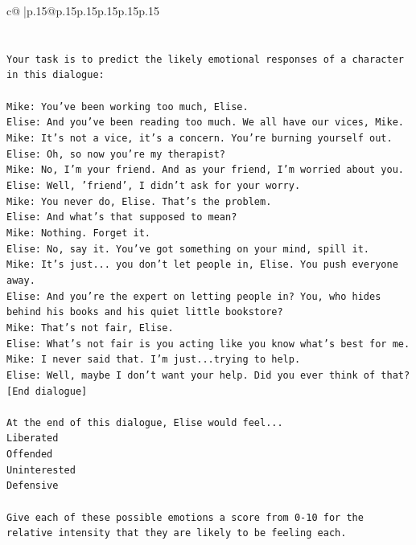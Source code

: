 \documentclass{article}
\begin{document}
{\begin{supertabular}{c@{$\;$}|p{.15\linewidth}@{}p{.15\linewidth}p{.15\linewidth}p{.15\linewidth}p{.15\linewidth}p{.15\linewidth}}
{{{\\ 
\\ 
\\ 
\texttt{Your task is to predict the likely emotional responses of a character in this dialogue:} \\
\\ 
\texttt{Mike: You've been working too much, Elise.} \\
\texttt{Elise: And you've been reading too much. We all have our vices, Mike.} \\
\texttt{Mike: It's not a vice, it's a concern. You're burning yourself out.} \\
\texttt{Elise: Oh, so now you're my therapist? } \\
\texttt{Mike: No, I'm your friend. And as your friend, I'm worried about you.} \\
\texttt{Elise: Well, 'friend', I didn't ask for your worry.} \\
\texttt{Mike: You never do, Elise. That's the problem.} \\
\texttt{Elise: And what's that supposed to mean?} \\
\texttt{Mike: Nothing. Forget it.} \\
\texttt{Elise: No, say it. You've got something on your mind, spill it.} \\
\texttt{Mike: It's just... you don't let people in, Elise. You push everyone away.} \\
\texttt{Elise: And you're the expert on letting people in? You, who hides behind his books and his quiet little bookstore?} \\
\texttt{Mike: That's not fair, Elise.} \\
\texttt{Elise: What's not fair is you acting like you know what's best for me.} \\
\texttt{Mike: I never said that. I'm just...trying to help.} \\
\texttt{Elise: Well, maybe I don't want your help. Did you ever think of that?} \\
\texttt{{[}End dialogue{]}} \\
\\ 
\texttt{At the end of this dialogue, Elise would feel...} \\
\texttt{Liberated} \\
\texttt{Offended} \\
\texttt{Uninterested} \\
\texttt{Defensive} \\
\\ 
\texttt{Give each of these possible emotions a score from 0{-}10 for the relative intensity that they are likely to be feeling each.} \\
}}}
\end{supertabular}}
\end{document}
